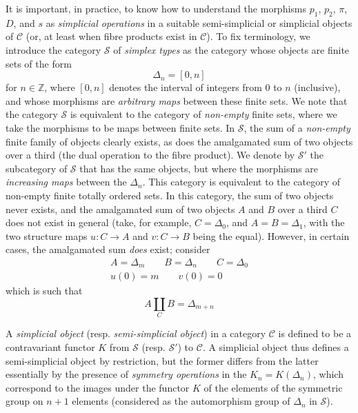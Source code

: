 It is important, in practice, to know how to understand the morphisms $p_1$, $p_2$, $\pi$, $D$, and $s$ as \emph{simplicial operations} in a suitable semi-simplicial or simplicial objects of $\mathcal{C}$ (or, at least when fibre products exist in $\mathcal{C}$).
To fix terminology, we introduce the category $\mathcal{S}$ of \emph{simplex types} as the category whose objects are finite sets of the form
\[
    \Delta_n = [0,n]
\]
for $n\in\mathbb{Z}$, where $[0,n]$ denotes the interval of integers from $0$ to $n$ (inclusive), and whose morphisms are \emph{arbitrary maps} between these finite sets.
We note that the category $\mathcal{S}$ is equivalent to the category of \emph{non-empty} finite sets, where we take the morphisms to be maps between finite sets.
In $\mathcal{S}$, the sum of a \emph{non-empty} finite family of objects clearly exists, as does the amalgamated sum of two objects over a third (the dual operation to the fibre product).
We denote by $\mathcal{S}'$ the subcategory of $\mathcal{S}$ that has the same objects, but where the morphisms are \emph{increasing maps} between the $\Delta_n$.
This category is equivalent to the category of non-empty finite totally ordered sets.
In this category, the sum of two objects never exists, and the amalgamated sum of two objects $A$ and $B$ over a third $C$ does not exist in general (take, for example, $C=\Delta_0$, and $A=B=\Delta_1$, with the two structure maps $u\colon C\to A$ and $v\colon C\to B$ being the equal).
However, in certain cases, the amalgamated sum \emph{does} exist;
consider
\[
    \begin{gathered}
        A = \Delta_m \qquad B = \Delta_n \qquad C = \Delta_0 \\
        u(0) = m \qquad v(0) = 0
    \end{gathered}
\]
which is such that
\[
    A\coprod_C B = \Delta_{m+n}
\]

A \emph{simplicial object} (resp. \emph{semi-simplicial object}) in a category $\mathcal{C}$ is defined to be a contravariant functor $K$ from $\mathcal{S}$ (resp. $\mathcal{S}'$) to $\mathcal{C}$.
A simplicial object thus defines a semi-simplicial object by restriction, but the former differs from the latter essentially by the presence of \emph{symmetry operations} in the $K_n=K(\Delta_n)$, which correspond to the images under the functor $K$ of the elements of the symmetric group on $n+1$ elements (considered as the automorphism group of $\Delta_n$ in $\mathcal{S}$).

